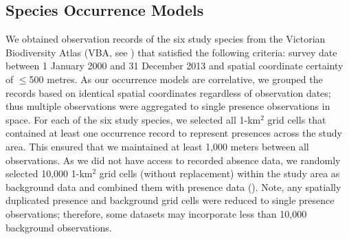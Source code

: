 \subsection{Species Occurrence Models}

We obtained observation records of the six study species from the Victorian Biodiversity Atlas (VBA, see ) that satisfied the following criteria: survey date between 1 January 2000 and 31 December 2013 and spatial coordinate certainty of $\leq$500 metres.  As our occurrence models are correlative, we grouped the records based on identical spatial coordinates regardless of observation dates; thus multiple observations were aggregated to single presence observations in space. For each of the six study species, we selected all 1-km$^2$ grid cells that contained at least one occurrence record to represent presences across the study area. This ensured that we maintained at least 1,000 meters between all observations. As we did not have access to recorded absence data, we randomly selected 10,000 1-km$^2$ grid cells (without replacement) within the study area as background data and combined them with presence data (). Note, any spatially duplicated presence and background grid cells were reduced to single presence observations; therefore, some datasets may incorporate less than 10,000 background observations.

